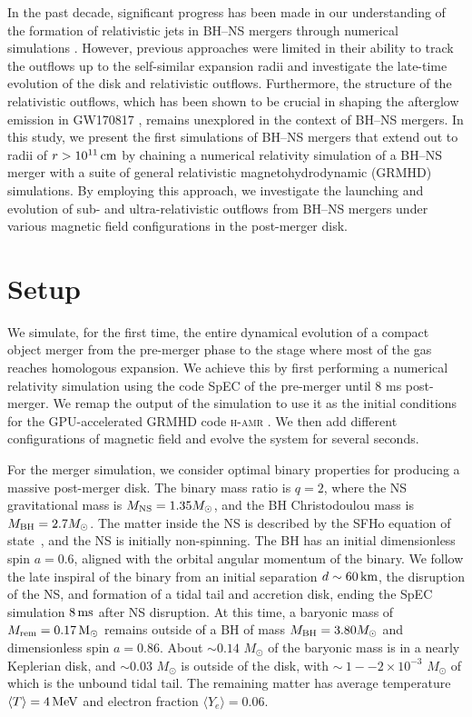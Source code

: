 \documentclass[twocolumn,dvipsnames]{aastex62}
\newcommand{\msun}{\,{M_{\odot}}}
\begin{document}
In the past decade, significant progress has been made in our understanding of the formation of relativistic jets in BH--NS mergers through numerical simulations \citep{Etienne2012,Kiuchi2015,Paschalidis2015,Ruiz2018,Hayashi2022a,Hayashi2023}. However, previous approaches were limited in their ability to track the outflows up to the self-similar expansion radii and investigate the late-time evolution of the disk and relativistic outflows. Furthermore, the structure of the relativistic outflows, which has been shown to be crucial in shaping the afterglow emission in GW170817 \citep[e.g.,][]{Alexander2017,Margutti2017,Mooley2018a,Mooley2018b,Lazzati2018,Lyman2018,Troja2018,Ghirlanda2019,Lamb2019}, remains unexplored in the context of BH--NS mergers. In this study, we present the first simulations of BH--NS mergers that extend out to radii of $r > 10^{11}\,{\rm cm} $ by chaining a numerical relativity simulation of a BH--NS merger with a suite of general relativistic magnetohydrodynamic (GRMHD) simulations. By employing this approach, we investigate the launching and evolution of sub- and ultra-relativistic outflows from BH--NS mergers under various magnetic field configurations in the post-merger disk.

\section{Setup}\label{sec:setup}

We simulate, for the first time, the entire dynamical evolution of a compact object merger from the pre-merger phase to the stage where most of the gas reaches homologous expansion. We achieve this by first performing a numerical relativity simulation using the code SpEC \citep{spec} of the pre-merger until 8 ms post-merger. We remap the output of the simulation to use it as the initial conditions for the GPU-accelerated GRMHD code \textsc{h-amr} \citep{Liska2022}. We then add different configurations of magnetic field and evolve the system for several seconds.

For the merger simulation, we consider optimal binary properties for producing a massive post-merger disk. The binary mass ratio is $ q = 2 $, where the NS gravitational mass is $M_{\rm NS}=1.35M_\odot$, and the BH Christodoulou mass is $M_{\rm BH}=2.7M_\odot$. The matter inside the NS is described by the SFHo equation of state~\citep{2013ApJ...774...17S}, and the NS is initially non-spinning. The BH has an initial dimensionless spin $a=0.6$, aligned with the orbital angular momentum of the binary. We follow the late inspiral of the binary from an initial separation $d\sim 60\,{\rm km}$, the disruption of the NS, and formation of a tidal tail and accretion disk, ending the SpEC simulation $8\,{\rm ms}$ after NS disruption. At this time, a baryonic mass of $M_{\rm rem}=0.17\,{\rm M_\odot}$ remains outside of a BH of mass $M_{\rm BH}=3.80M_\odot$ and dimensionless spin $a=0.86$. About $ \sim 0.14\,\msun $ of the baryonic mass is in a nearly Keplerian disk, and $ \sim 0.03\,\msun $ is outside of the disk, with $ \sim~1--2\times 10^{-3}\,\msun $ of which is the unbound tidal tail. The remaining matter has average temperature $\langle T\rangle = 4\,{\rm MeV}$ and electron fraction $\langle Y_e\rangle =0.06$.
\end{document}
